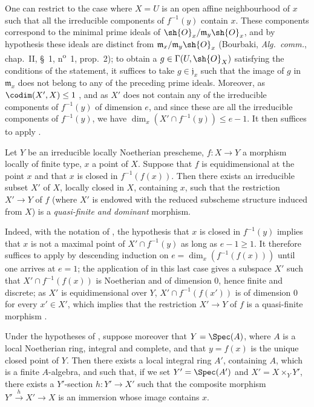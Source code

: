 One can restrict to the case where $X=U$ is an open affine neighbourhood of $x$ such that all the irreducible components of $f^{-1}(y)$ contain $x$.
These components correspond to the minimal prime ideals of $\sh{O}_x/\mathfrak{m}_y\sh{O}_x$, and by hypothesis these ideals are distinct from $\mathfrak{m}_x/\mathfrak{m}_y\sh{O}_x$ (Bourbaki, \emph{Alg.\ comm.}, chap.~II, \S~1, n\textsuperscript{o}~1, prop.~2); to obtain a $g\in\Gamma(U,\sh{O}_X)$ satisfying the conditions of the statement, it suffices to take $g\in\mathfrak{j}_x$ such that the image of $g$ in $\mathfrak{m}_x$ does not belong to any of the preceding prime ideals.
Moreover, as $\codim(X',X)\leq 1$ , and as $X'$ does not contain any of the irreducible components of $f^{-1}(y)$ of dimension $e$, and since these are all the irreducible components of $f^{-1}(y)$, we have  $\dim_x(X'\cap f^{-1}(y))\leq e-1$.
It then suffices to apply .

\begin{proposition}[14.5.3]
\label{IV.14.5.3}
Let $Y$ be an irreducible locally Noetherian prescheme, $f:X\to Y$ a morphism locally of finite type, $x$ a point of $X$.
Suppose that $f$ is equidimensional at the point $x$ and that $x$ is closed in $f^{-1}(f(x))$.
Then there exists an irreducible subset $X'$ of $X$, locally closed in $X$, containing $x$, such that the restriction $X'\to Y$ of $f$ (where $X'$ is endowed with the reduced subscheme structure induced from $X$) is a \emph{quasi-finite and dominant} morphism.
\end{proposition}

Indeed, with the notation of , the hypothesis that $x$ is closed in $f^{-1}(y)$ implies that $x$ is not a maximal point of $X'\cap f^{-1}(y)$ as long as $e-1\geq 1$.
It therefore suffices to apply  by descending induction on $e=\dim_x(f^{-1}(f(x)))$ until one arrives at $e=1$; the application of  in this last case gives a subspace $X'$ such that $X'\cap f^{-1}(f(x))$ is Noetherian and of dimension $0$, hence finite and discrete; as $X'$ is equidimensional over $Y$, $X'\cap f^{-1}(f(x'))$ is of dimension $0$ for every $x'\in X'$, which implies that the restriction $X'\to Y$ of $f$ is a quasi-finite morphism .

\begin{corollary}[14.5.4]
\label{IV.14.5.4}
Under the hypotheses of , suppose moreover that $Y=\Spec(A)$, where $A$ is a local Noetherian ring, integral and complete, and that $y=f(x)$ is the unique closed point of $Y$.
Then there exists a local integral ring $A'$, containing $A$, which is a finite $A$-algebra, and such that, if we set $Y'=\Spec(A')$ and $X'=X\times_Y Y'$, there exists a $Y'$-section $h:Y'\to X'$ such that the composite morphism $Y'\xrightarrow{h}X'\to X$ is an immersion whose image contains $x$.
\end{corollary}

